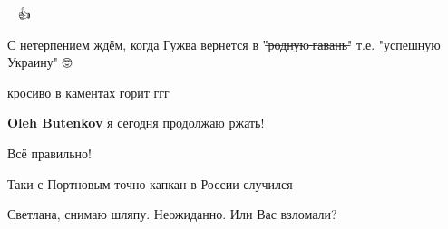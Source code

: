 \begin{itemize}
👏👏👏👍

 
С нетерпением ждём, когда Гужва вернется в "̶р̶о̶д̶н̶у̶ю̶ ̶г̶а̶в̶а̶н̶ь̶" т.е. "успешную Украину" 🤓

 
кросиво в каментах горит
ггг

\begin{itemize}
 
\textbf{Oleh Butenkov} я сегодня продолжаю ржать!
\end{itemize}

 
Всё правильно!

 
Таки с Портновым точно капкан в России случился

 
Светлана, снимаю шляпу. Неожиданно. Или Вас взломали?

 

\end{itemize}
